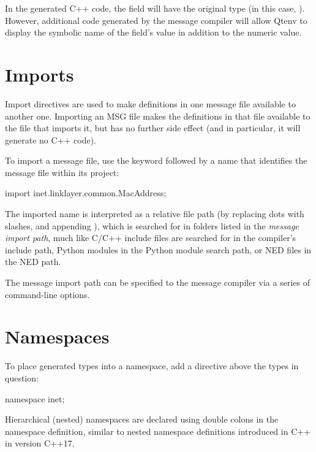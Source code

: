 In the generated C++ code, the field will have the original type (in this case,
). However, additional code generated by the message compiler
will allow Qtenv to display the symbolic name of the field's value in addition
to the numeric value.


\section{Imports}
\label{sec:msg-defs:imports}

Import directives are used to make definitions in one message file available to another
one. Importing an MSG file makes the definitions in that file available to the
file that imports it, but has no further side effect (and in particular, it will
generate no C++ code).

To import a message file, use the  keyword followed by a name
that identifies the message file within its project:

\begin{msg}
import inet.linklayer.common.MacAddress;
\end{msg}

The imported name is interpreted as a relative file path (by
replacing dots with slashes, and appending ), which is searched for in
folders listed in the \textit{message import path}, much like C/C++ include
files are searched for in the compiler's include path, Python modules in the
Python module search path, or NED files in the NED path.

The message import path can be specified to the message compiler via a series
of  command-line options.


\section{Namespaces}
\label{sec:msg-defs:namespaces}
\label{sec:msg-defs:declaring-a-namespace}

To place generated types into a namespace, add a  directive
above the types in question:

\begin{msg}
namespace inet;
\end{msg}

Hierarchical (nested) namespaces are declared using double colons in the
namespace definition, similar to nested namespace definitions introduced in
C++ in version C++17.

